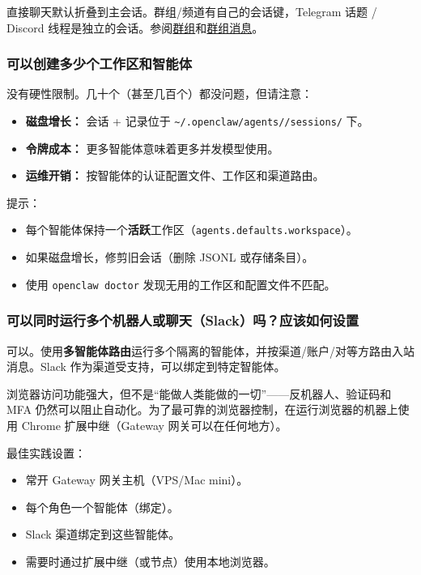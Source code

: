 直接聊天默认折叠到主会话。群组/频道有自己的会话键，Telegram 话题 / Discord 线程是独立的会话。参阅\href{/channels/groups}{群组}和\href{/channels/group-messages}{群组消息}。

\subsubsection{可以创建多少个工作区和智能体}


没有硬性限制。几十个（甚至几百个）都没问题，但请注意：

\begin{itemize}
  \item \textbf{磁盘增长：} 会话 + 记录位于 \texttt{\textasciitilde{}/.openclaw/agents//sessions/} 下。
  \item \textbf{令牌成本：} 更多智能体意味着更多并发模型使用。
  \item \textbf{运维开销：} 按智能体的认证配置文件、工作区和渠道路由。
\end{itemize}


提示：

\begin{itemize}
  \item 每个智能体保持一个\textbf{活跃}工作区（\texttt{agents.defaults.workspace}）。
  \item 如果磁盘增长，修剪旧会话（删除 JSONL 或存储条目）。
  \item 使用 \texttt{openclaw doctor} 发现无用的工作区和配置文件不匹配。
\end{itemize}


\subsubsection{可以同时运行多个机器人或聊天（Slack）吗？应该如何设置}


可以。使用\textbf{多智能体路由}运行多个隔离的智能体，并按渠道/账户/对等方路由入站消息。Slack 作为渠道受支持，可以绑定到特定智能体。

浏览器访问功能强大，但不是“能做人类能做的一切”——反机器人、验证码和 MFA 仍然可以阻止自动化。为了最可靠的浏览器控制，在运行浏览器的机器上使用 Chrome 扩展中继（Gateway 网关可以在任何地方）。

最佳实践设置：

\begin{itemize}
  \item 常开 Gateway 网关主机（VPS/Mac mini）。
  \item 每个角色一个智能体（绑定）。
  \item Slack 渠道绑定到这些智能体。
  \item 需要时通过扩展中继（或节点）使用本地浏览器。
\end{itemize}


